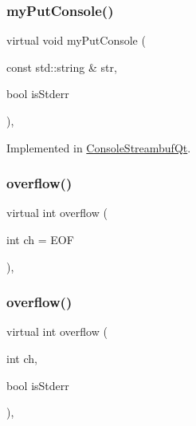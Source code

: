 \subsubsection{\texorpdfstring{my\+Put\+Console()}{myPutConsole()}}
{\footnotesize\ttfamily virtual void my\+Put\+Console (\begin{DoxyParamCaption}\item[{const std\+::string \&}]{str,  }\item[{bool}]{is\+Stderr }\end{DoxyParamCaption})\hspace{0.3cm}{\ttfamily [protected]}, {}}



Implemented in \mbox{\hyperlink{classsgl_1_1qtgui_1_1ConsoleStreambufQt_aa8582bd55e3d7fc8860ca9c87efe3dea}{Console\+Streambuf\+Qt}}.

\mbox{\label{classsgl_1_1ConsoleStreambuf_adccb3cd5475ba3c83bc2b0a8cbd731c0}} 
\subsubsection{\texorpdfstring{overflow()}{overflow()}\hspace{0.1cm}{\footnotesize\ttfamily [1/2]}}
{\footnotesize\ttfamily virtual int overflow (\begin{DoxyParamCaption}\item[{int}]{ch = {\ttfamily EOF} }\end{DoxyParamCaption})\hspace{0.3cm}{\ttfamily [inline]}, {\ttfamily [virtual]}}

\mbox{\label{classsgl_1_1ConsoleStreambuf_a5cfed6bdc955e2129ced962625045f8e}} 
\subsubsection{\texorpdfstring{overflow()}{overflow()}\hspace{0.1cm}{\footnotesize\ttfamily [2/2]}}
{\footnotesize\ttfamily virtual int overflow (\begin{DoxyParamCaption}\item[{int}]{ch,  }\item[{bool}]{is\+Stderr }\end{DoxyParamCaption})\hspace{0.3cm}{\ttfamily [inline]}, {\ttfamily [virtual]}}

